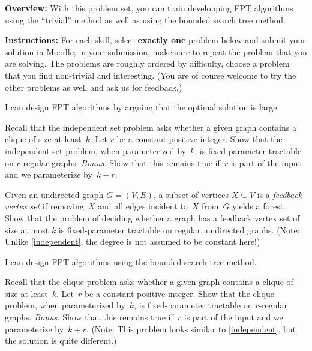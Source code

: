 \documentclass{uebung_cs}
\begin{document}
\textbf{Overview:} With this problem set, you can train developping FPT algorithms using the \enquote{trivial} method as well as using the bounded search tree method.

\textbf{Instructions:} For each skill, select \textbf{exactly one} problem below and submit your solution in \href{https://moodle.studiumdigitale.uni-frankfurt.de/moodle/course/view.php?id=6259}{Moodle}; in your submission, make sure to repeat the problem that you are solving.
The problems are roughly ordered by difficulty, choose a problem that you find non-trivial and interesting. (You are of course welcome to try the other problems as well and ask us for feedback.)


\begin{skill}
  I can design FPT algorithms by arguing that the optimal solution is large.
\end{skill}

\begin{exercise}\label{independent}
  Recall that the independent set problem asks whether a given graph contains a clique of size at least~$k$.
  Let $r$ be a constant positive integer.
  Show that the independent set problem, when parameterized by~$k$, is fixed-parameter tractable on $r$-regular graphs.
  \emph{Bonus:} Show that this remains true if~$r$ is part of the input and we parameterize by~$k+r$.
\end{exercise}

\begin{exercise}
  Given an undirected graph $G = (V, E)$, a subset of vertices $X \subseteq V$ is a \emph{feedback vertex
  set} if removing~$X$ and all edges incident to~$X$ from~$G$ yields a forest. Show that the problem of deciding
  whether a graph has a feedback vertex set of size at most $k$ is fixed-parameter tractable on regular,
  undirected graphs. (Note: Unlike \ref{independent}, the degree is not assumed to be constant here!)
\end{exercise}


\begin{skill}
  I can design FPT algorithms using the bounded search tree method.
\end{skill}

  \begin{exercise}\label{clique}
    Recall that the clique problem asks whether a given graph contains a clique of size at least~$k$.
    Let~$r$ be a constant positive integer.
    Show that the clique problem, when parameterized by~$k$, is fixed-parameter tractable on $r$-regular graphs.
    \emph{Bonus:} Show that this remains true if~$r$ is part of the input and we parameterize by~$k+r$. (Note: This problem looks similar to \ref{independent}, but the solution is quite different.)
  \end{exercise}
\end{document}
